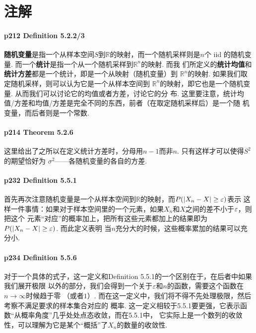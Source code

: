 \newpage
\section{注解}
  \paragraph{p212 Definition 5.2.2/3}
    \textbf{随机变量}是指一个从样本空间$S$到$\mathbb{R}$的映射，而一个随机采样则是$n$个
    iid 的随机变量. 而一个\textbf{统计}是指一个从一个随机采样到$\mathbb{R}^n$的映射. 而我
    们所定义的\textbf{统计均值}和\textbf{统计方差}都是一个统计，即是一个从映射（随机变量）到
    $\mathbb{R}^n$的映射. 如果我们取定随机采样，则可以认为它是一个从样本空间到
    $\mathbb{R}^n$的映射，即它也是一个随机变量. 从而我们可以讨论它的均值或者方差，讨论它的分
    布. 这里要注意，统计均值/方差和均值/方差是完全不同的东西，前者（在取定随机采样后）是一个随
    机变量，而后者则是一个常数. 

  \paragraph{p214 Theorem 5.2.6}
    这里给出了之所以在定义统计方差时，分母用$n-1$而非$n$. 只有这样才可以使得$S^2$的期望恰好为
    $\sigma^2$——各随机变量的各自的方差. 

  \paragraph{p232 Definition 5.5.1}
    首先再次注意随机变量是一个从样本空间到$\mathbb{R}$的映射，而$P(|X_n-X|\ge\varepsilon)$表示
    这样一件事情：如果对于样本空间里的一个元素，如果$X_n$和$X$之间的差不小于$\varepsilon$，则把这个
    元素“对应”的概率加上，把所有这些元素都加上的结果即为$P(|X_n-X|\ge\varepsilon)$. 而此定义表明
    当$n$充分大的时候，这些概率累加的结果可以充分小. 

  \paragraph{p234 Definition 5.5.6}
    对于一个具体的式子，这一定义和Definition 5.5.1的一个区别在于，在后者中如果我们展开极限
    以外的部分，我们会得到一个关于$\varepsilon$和$n$的函数，需要这个函数在$n\to\infty$时候趋于零
    （或者$1$）. 而在这一定义中，我们将不得不先处理极限，然后考察不满足要求的样本集合对应的
    概率. 这一定义相较于5.5.1要更强，它表示函数“从概率角度”几乎处处点态收敛，而在5.5.1中，
    它实际上是一个数列的收敛性，可以理解为它是某个“概括”了$X_n$的数量的收敛性. 

